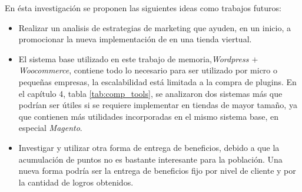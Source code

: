 En ésta investigación se proponen las siguientes ideas como trabajos futuros:


\begin{itemize}

\item Realizar un analisis de estrategias de marketing que ayuden, en un inicio, a promocionar
la nueva implementación de {\gam} en una tienda viertual.

\item El sistema base utilizado en este trabajo de memoria,\emph{Wordpress $+$ Woocommerce}, contiene
todo lo necesario para ser utilizado por micro o pequeñas empresas, la escalabilidad está limitada
a la compra de plugins. En el capítulo 4, tabla \ref{tab:comp_tools}, se analizaron dos sistemas más
que podrían ser útiles si se requiere implementar {\gam} en tiendas de mayor tamaño, ya que contienen
más utilidades incorporadas en el mismo sistema base, en especial \emph{Magento}.

\item Investigar y utilizar otra forma de entrega de beneficios, debido a que la
acumulación de puntos no es bastante interesante para la población. Una nueva forma podría ser la entrega
de beneficios fijo por nivel de cliente y por la cantidad de logros obtenidos.

\end{itemize}


